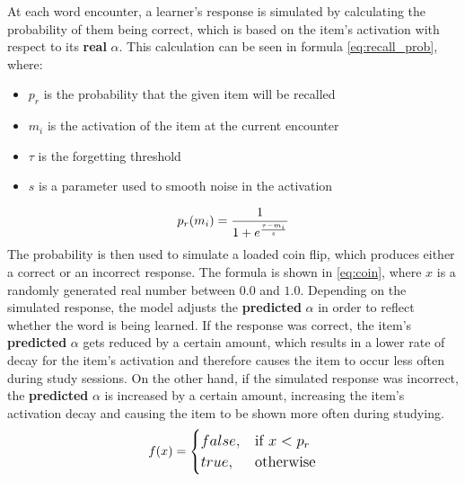 \documentclass[a4paper]{report}
\begin{document}
At each word encounter, a learner's response is simulated by calculating the probability of them being correct, which is based on the item's activation with respect to its \textbf{real} $\alpha$. This calculation can be seen in formula \ref{eq:recall_prob}, where:
\begin{itemize}
    \item $p_r$ is the probability that the given item will be recalled
    \item $m_i$ is the activation of the item at the current encounter
    \item $\tau$ is the forgetting threshold
    \item $s$ is a parameter used to smooth noise in the activation
\end{itemize}
\begin{equation}
\begin{large}
\label{eq:recall_prob}
p_r(m_i) = \frac{1}{1 + e^\frac{\tau - m_i}{s}}
\end{large}
\end{equation}
The probability is then used to simulate a loaded coin flip, which produces either a correct or an incorrect response. The formula is shown in \ref{eq:coin}, where $x$ is a randomly generated real number between $0.0$ and $1.0$. Depending on the simulated response, the model adjusts the \textbf{predicted} $\alpha$ in order to reflect whether the word is being learned. If the response was correct, the item's \textbf{predicted} $\alpha$ gets reduced by a certain amount, which results in a lower rate of decay for the item's activation and therefore causes the item to occur less often during study sessions. On the other hand, if the simulated response was incorrect, the \textbf{predicted} $\alpha$ is increased by a certain amount, increasing the item's activation decay and causing the item to be shown more often during studying.
\begin{equation}
\begin{large}
\label{eq:coin}
f(x) = 
\begin{cases}
    false, & \text{if } x < p_r\\
    true,  & \text{otherwise}
\end{cases}
\end{large}
\end{equation}
\end{document}
